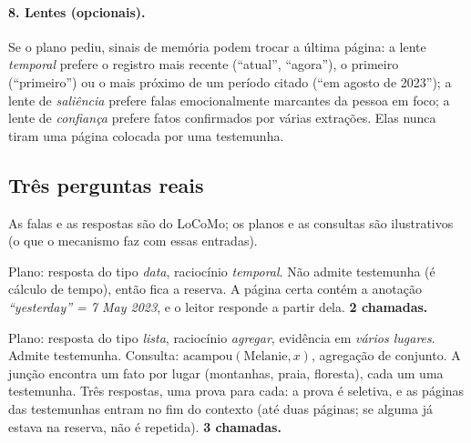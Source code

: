 \documentclass[11pt]{article}
\begin{document}
\paragraph{8. Lentes (opcionais).}
Se o plano pediu, sinais de memória podem trocar a última página: a lente
\emph{temporal} prefere o registro mais recente (``atual'', ``agora''), o
primeiro (``primeiro'') ou o mais próximo de um período citado (``em agosto
de 2023''); a lente de \emph{saliência} prefere falas emocionalmente
marcantes da pessoa em foco; a lente de \emph{confiança} prefere fatos
confirmados por várias extrações. Elas nunca tiram uma página colocada por
uma testemunha.

\subsection{Três perguntas reais}

As falas e as respostas são do LoCoMo; os planos e as consultas são
ilustrativos (o que o mecanismo faz com essas entradas).

\begin{exemplo}
Plano: resposta do tipo \emph{data}, raciocínio \emph{temporal}. Não admite
testemunha (é cálculo de tempo), então fica a reserva. A página certa contém
a anotação \emph{``yesterday'' = 7 May 2023}, e o leitor responde a partir
dela. \textbf{2 chamadas.}
\end{exemplo}

\begin{exemplo}
Plano: resposta do tipo \emph{lista}, raciocínio \emph{agregar}, evidência em
\emph{vários lugares}. Admite testemunha. Consulta:
$\mathrm{acampou}(\text{Melanie},x)$, agregação de conjunto. A junção encontra
um fato por lugar (montanhas, praia, floresta), cada um uma testemunha.
Três respostas, uma prova para cada: a prova é seletiva, e as páginas das
testemunhas entram no fim do contexto (até duas páginas; se alguma já estava
na reserva, não é repetida). \textbf{3 chamadas.}
\end{exemplo}
\end{document}
